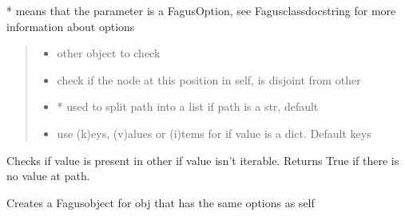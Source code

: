 \documentclass[a4paper,10pt,english]{sphinxmanual}
\begin{document}
\begin{fulllineitems}
\begin{fulllineitems}
\sphinxAtStartPar
* means that the parameter is a FagusOption, see Fagus\sphinxhyphen{}class\sphinxhyphen{}docstring for more information about options
\begin{quote}\begin{description}
\begin{itemize}
\item {}
\sphinxAtStartPar
{} \textendash{} other object to check

\item {}
\sphinxAtStartPar
{} \textendash{} check if the node at this position in self, is disjoint from other

\item {}
\sphinxAtStartPar
{} \textendash{} * used to split path into a list if path is a str, default 

\item {}
\sphinxAtStartPar
{} \textendash{} use (k)eys, (v)alues or (i)tems for if value is a dict. Default keys

\end{itemize}

\end{description}\end{quote}
\begin{description}
\sphinxAtStartPar
Checks if value is present in other if value isn’t iterable. Returns True if there is no value at path.

\end{description}

\end{fulllineitems}


\begin{fulllineitems}
\label{\detokenize{fagus.fagus:fagus.fagus.Fagus.child}}
\pysigstartsignatures
{}
\pysigstopsignatures
\sphinxAtStartPar
Creates a Fagus\sphinxhyphen{}object for obj that has the same options as self


\end{fulllineitems}
\end{fulllineitems}
\end{document}
